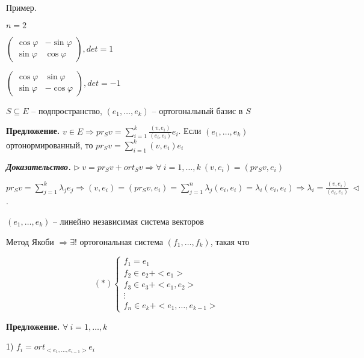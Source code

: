 \vspace{\baselineskip}
Пример.

$n = 2$

$\begin{pmatrix} \cos \varphi & - \sin \varphi \\
\sin \varphi & \cos \varphi \end{pmatrix}, det = 1$

$\begin{pmatrix} \cos \varphi & \sin \varphi \\
\sin \varphi & - \cos \varphi \end{pmatrix}, det = -1$

\vspace{\baselineskip}
$S \subseteq E$ -- подпространство, $(e_1, \dots, e_k)$ -- ортогональный базис в $S$

\vspace{\baselineskip}
\textbf{Предложение.} $v \in E \Rightarrow pr_S v = \sum\limits_{i=1}^k \frac{(v, e_i)}{(e_i, e_i)} e_i$. Если $(e_1, \dots, e_k)$ ортонормированный, то $pr_S v = \sum\limits_{i=1}^k (v, e_i) e_i$

\vspace{\baselineskip}
\textbf{\textit{Доказательство.}} $\rhd \ v = pr_S v + ort_S v \Rightarrow \forall \ i = 1, \dots, k \ (v, e_i) = (pr_S v, e_i)$

$pr_S v = \sum\limits_{j = 1}^k \lambda_j e_j \Rightarrow (v, e_i) = (pr_S v, e_i) = \sum\limits_{j = 1}^n \lambda_j (e_i, e_i) = \lambda_i (e_i, e_i) \Rightarrow \lambda_i = \frac{(v, e_i)}{(e_i, e_i)} \ \lhd$.

\vspace{\baselineskip}
$(e_1, \dots, e_k)$  -- линейно независимая система векторов

Метод Якоби $\Rightarrow \exists!$ ортогональная система $(f_1, \dots, f_k)$, такая что

\[
(*) \begin{cases}
		f_1 = e_1 \\
		f_2 \in e_2 + <e_1> \\
        f_3 \in e_3 + <e_1, e_2> \\
        \vdots \\
        f_n \in e_k + <e_1, \dots, e_{k-1}>
	\end{cases}
\]  

\vspace{\baselineskip}
\textbf{Предложение.} $\forall \ i = 1, \dots, k$

1) $f_i = ort_{<e_1, \dots, e_{i-1}>} e_i$

